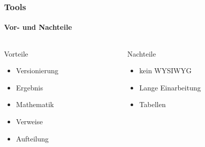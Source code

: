 \begin{frame}
    \frametitle{Tools}
    \framesubtitle{Vor- und Nachteile}
    \begin{columns}
        \begin{column}{0.50\textwidth}
            \begin{block}{Vorteile}
                \begin{itemize}
                    \item Versionierung
                    \item Ergebnis
                    \item Mathematik
                    \item Verweise
                    \item Aufteilung
                \end{itemize}
            \end{block}
        \end{column}
        \pause
        \begin{column}{0.50\textwidth}
            \begin{block}{Nachteile}
                \begin{itemize}
                    \item kein WYSIWYG
                    \item Lange Einarbeitung
                    \item Tabellen
                \end{itemize}
            \end{block}
        \end{column}
    \end{columns}
\end{frame}
